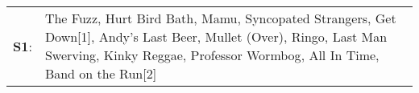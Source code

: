 \begin{supertabular}{p{0.03\textwidth}p{0.92\textwidth}}
 \textbf{S1}:  &  The Fuzz\textsuperscript{}, \enspace Hurt Bird Bath\textsuperscript{}, \enspace Mamu\textsuperscript{}, \enspace Syncopated Strangers\textsuperscript{}, \enspace Get Down[1]\textsuperscript{}, \enspace Andy's Last Beer\textsuperscript{}, \enspace Mullet (Over)\textsuperscript{}, \enspace Ringo\textsuperscript{}, \enspace Last Man Swerving\textsuperscript{}, \enspace Kinky Reggae\textsuperscript{}, \enspace Professor Wormbog\textsuperscript{}, \enspace All In Time\textsuperscript{}, \enspace Band on the Run[2]\textsuperscript{}  \enspace  \\
\end{supertabular}
